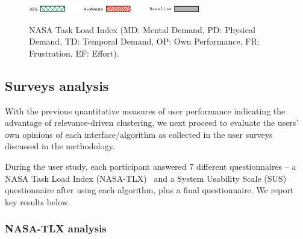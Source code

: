 \begin{figure}[t!]
\begin{centering}
\includegraphics[width=7.5cm]{imgs/legend4}\\
\par\end{centering}
\caption{NASA Task Load Index (MD: Mental Demand, PD: Physical Demand, TD: Temporal Demand, OP: Own Performance, FR: Frustration, EF: Effort). }
\label{fig:NASA}
\end{figure}

\subsection{Surveys analysis}

With the previous quantitative measures of user performance indicating the advantage of relevance-driven clustering, we next proceed to evaluate the users' own opinions of each interface/algorithm as collected in the user surveys discussed in the methodology.

During the user study, each participant answered 7 different questionnaires -- a NASA Task Load Index (NASA-TLX)~\cite{HART1988139} and a System Usability Scale (SUS)~\cite{brooke1996sus} questionnaire after using each algorithm, plus a final questionnaire. We report key results below.




\subsubsection{NASA-TLX analysis}

